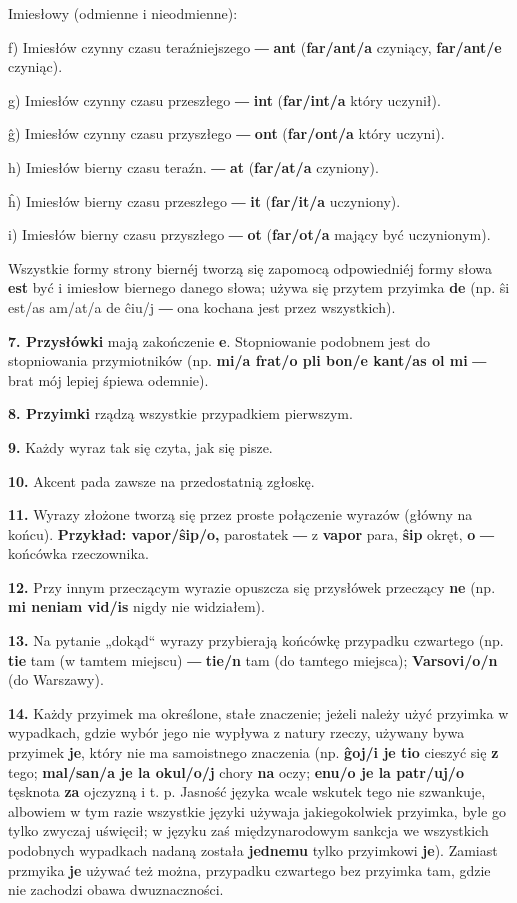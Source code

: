 Imiesłowy (odmienne i nieodmienne):

f) Imiesłów czynny czasu teraźniejszego ― \textbf{ant} (\textbf{far/ant/a} czyniący, \textbf{far/ant/e} czyniąc).

g) Imiesłów czynny czasu przeszłego ― \textbf{int} (\textbf{far/int/a} który uczynił).

ĝ) Imiesłów czynny czasu przyszłego ― \textbf{ont} (\textbf{far/ont/a} który uczyni).

h) Imiesłów bierny czasu teraźn. ― \textbf{at} (\textbf{far/at/a} czyniony).

ĥ) Imiesłów bierny czasu przeszłego ― \textbf{it} (\textbf{far/it/a} uczyniony).

i) Imiesłów bierny czasu przyszłego ― \textbf{ot} (\textbf{far/ot/a} mający być uczynionym).

Wszystkie formy strony biernéj tworzą się zapomocą odpowiedniéj formy słowa \textbf{est} być i imiesłow biernego danego słowa; używa się przytem przyimka \textbf{de} (np. ŝi est/as am/at/a de ĉiu/j ― ona kochana jest przez wszystkich).

\textbf{7. Przysłówki} mają zakończenie \textbf{e}. Stopniowanie podobnem jest do stopniowania przymiotników (np. \textbf{mi/a frat/o pli bon/e kant/as ol mi} ― brat mój lepiej śpiewa odemnie).

\textbf{8. Przyimki} rządzą wszystkie przypadkiem pierwszym.

\begin{center}
\large {}
\end{center}

\textbf{9.} Każdy wyraz tak się czyta, jak się pisze.

\textbf{10.} Akcent pada zawsze na przedostatnią zgłoskę.

\textbf{11.} Wyrazy złożone tworzą się przez proste połączenie wyrazów (główny na końcu). \textbf{Przykład: vapor/ŝip/o,} parostatek ― z \textbf{vapor} para, \textbf{ŝip} okręt, \textbf{o} ― końcówka rzeczownika.

\textbf{12.} Przy innym przeczącym wyrazie opuszcza się przysłówek przeczący \textbf{ne} (np. \textbf{mi neniam vid/is} nigdy nie widziałem).

\textbf{13.} Na pytanie „dokąd“ wyrazy przybierają końcówkę przypadku czwartego (np. \textbf{tie} tam (w tamtem miejscu) ― \textbf{tie/n} tam (do tamtego miejsca); \textbf{Varsovi/o/n} (do Warszawy).

\textbf{14.} Każdy przyimek ma określone, stałe znaczenie; jeżeli należy użyć przyimka w wypadkach, gdzie wybór jego nie wypływa z natury rzeczy, używany bywa przyimek \textbf{je}, który nie ma samoistnego znaczenia (np. \textbf{ĝoj/i je tio} cieszyć się \textbf{z} tego; \textbf{mal/san/a je la okul/o/j} chory \textbf{na} oczy; \textbf{enu/o je la patr/uj/o} tęsknota \textbf{za} ojczyzną i t. p. Jasność języka wcale wskutek tego nie szwankuje, albowiem w tym razie wszystkie języki używaja jakiegokolwiek przyimka, byle go tylko zwyczaj uświęcił; w języku zaś międzynarodowym sankcja we wszystkich podobnych wypadkach nadaną została \textbf{jednemu} tylko przyimkowi \textbf{je}). Zamiast przmyika \textbf{je} używać też można, przypadku czwartego bez przyimka tam, gdzie nie zachodzi obawa dwuznaczności.


